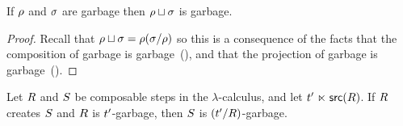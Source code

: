 \begin{lemma}
If $\rho$ and $\sigma$ are garbage then $\rho \sqcup \sigma$ is garbage.
\end{lemma}
\begin{proof}
Recall that $\rho \sqcup \sigma = \rho(\sigma/\rho)$
so this is a consequence of the facts
that the composition of garbage is garbage~(),
and that the projection of garbage is garbage~().
\end{proof}

\begin{lemma}
Let $R$ and $S$ be composable steps in the $\lambda$-calculus,
and let $t' \mathrel{\ltimes} \mathsf{src}(R)$.
If $R$ creates $S$ and $R$ is $t'$-garbage,
then $S$ is $(t'/R)$-garbage.
\end{lemma}
